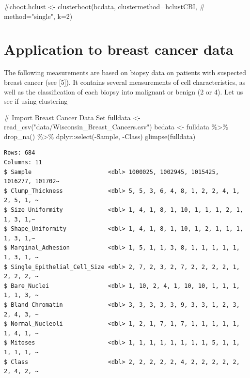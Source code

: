 \documentclass[
  letterpaper,
  DIV=11,
  numbers=noendperiod]{scrreprt}
\newenvironment{Shaded}{\begin{snugshade}}{\end{snugshade}}
\newcommand{\CommentTok}[1]{\textcolor[rgb]{0.37,0.37,0.37}{#1}}
\newcommand{\FunctionTok}[1]{\textcolor[rgb]{0.28,0.35,0.67}{#1}}
\newcommand{\NormalTok}[1]{\textcolor[rgb]{0.00,0.23,0.31}{#1}}
\newcommand{\OtherTok}[1]{\textcolor[rgb]{0.00,0.23,0.31}{#1}}
\newcommand{\SpecialCharTok}[1]{\textcolor[rgb]{0.37,0.37,0.37}{#1}}
\newcommand{\StringTok}[1]{\textcolor[rgb]{0.13,0.47,0.30}{#1}}
\begin{document}
\begin{Shaded}
\begin{Highlighting}[]
\CommentTok{\#cboot.hclust \textless{}{-} clusterboot(bcdata, clustermethod=hclustCBI,}
       \CommentTok{\#                    method="single", k=2)}
\end{Highlighting}
\end{Shaded}

\hypertarget{application-to-breast-cancer-data}{%
\section{Application to breast cancer
data}\label{application-to-breast-cancer-data}}

The following measurements are based on biopsy data on patients with
suspected breast cancer (see {[}5{]}). It contains several measurements
of cell characteristics, as well as the classification of each biopsy
into malignant or benign (2 or 4). Let us see if using clustering

\begin{Shaded}
\begin{Highlighting}[]
\CommentTok{\# Import Breast Cancer Data Set}
\NormalTok{fulldata }\OtherTok{\textless{}{-}} \FunctionTok{read\_csv}\NormalTok{(}\StringTok{"data/Wisconsin\_Breast\_Cancers.csv"}\NormalTok{)}
\NormalTok{bcdata }\OtherTok{\textless{}{-}}\NormalTok{ fulldata }\SpecialCharTok{\%\textgreater{}\%} \FunctionTok{drop\_na}\NormalTok{() }\SpecialCharTok{\%\textgreater{}\%}\NormalTok{ dplyr}\SpecialCharTok{::}\FunctionTok{select}\NormalTok{(}\SpecialCharTok{{-}}\NormalTok{Sample, }\SpecialCharTok{{-}}\NormalTok{Class)}
\FunctionTok{glimpse}\NormalTok{(fulldata)}
\end{Highlighting}
\end{Shaded}

\begin{verbatim}
Rows: 684
Columns: 11
$ Sample                      <dbl> 1000025, 1002945, 1015425, 1016277, 101702~
$ Clump_Thickness             <dbl> 5, 5, 3, 6, 4, 8, 1, 2, 2, 4, 1, 2, 5, 1, ~
$ Size_Uniformity             <dbl> 1, 4, 1, 8, 1, 10, 1, 1, 1, 2, 1, 1, 3, 1,~
$ Shape_Uniformity            <dbl> 1, 4, 1, 8, 1, 10, 1, 2, 1, 1, 1, 1, 3, 1,~
$ Marginal_Adhesion           <dbl> 1, 5, 1, 1, 3, 8, 1, 1, 1, 1, 1, 1, 3, 1, ~
$ Single_Epithelial_Cell_Size <dbl> 2, 7, 2, 3, 2, 7, 2, 2, 2, 2, 1, 2, 2, 2, ~
$ Bare_Nuclei                 <dbl> 1, 10, 2, 4, 1, 10, 10, 1, 1, 1, 1, 1, 3, ~
$ Bland_Chromatin             <dbl> 3, 3, 3, 3, 3, 9, 3, 3, 1, 2, 3, 2, 4, 3, ~
$ Normal_Nucleoli             <dbl> 1, 2, 1, 7, 1, 7, 1, 1, 1, 1, 1, 1, 4, 1, ~
$ Mitoses                     <dbl> 1, 1, 1, 1, 1, 1, 1, 1, 5, 1, 1, 1, 1, 1, ~
$ Class                       <dbl> 2, 2, 2, 2, 2, 4, 2, 2, 2, 2, 2, 2, 4, 2, ~
\end{verbatim}
\end{document}
